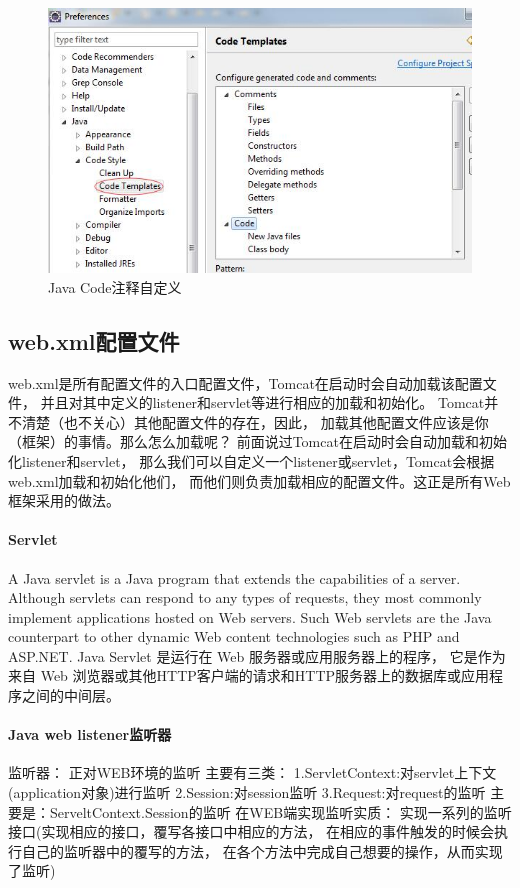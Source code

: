 \documentclass{book}
\begin{document}
\begin{figure}[htbp]
	\centering
	\includegraphics[scale=0.6]{JavaCodeTemplate.jpg}
	\caption{Java Code注释自定义}
	\label{code:JavaCodeTemplate}
\end{figure}

\subsection{web.xml配置文件}

web.xml是所有配置文件的入口配置文件，Tomcat在启动时会自动加载该配置文件，
并且对其中定义的listener和servlet等进行相应的加载和初始化。
Tomcat并不清楚（也不关心）其他配置文件的存在，因此，
加载其他配置文件应该是你（框架）的事情。那么怎么加载呢？
前面说过Tomcat在启动时会自动加载和初始化listener和servlet，
那么我们可以自定义一个listener或servlet，Tomcat会根据web.xml加载和初始化他们，
而他们则负责加载相应的配置文件。这正是所有Web框架采用的做法。


\paragraph{Servlet}
A Java servlet is a Java program that extends the capabilities of a server. 
Although servlets can respond to any types of requests, 
they most commonly implement applications hosted on Web servers.
Such Web servlets are the Java counterpart to other dynamic 
Web content technologies such as PHP and ASP.NET.
Java Servlet 是运行在 Web 服务器或应用服务器上的程序，
它是作为来自 Web 浏览器或其他HTTP客户端的请求和HTTP服务器上的数据库或应用程序之间的中间层。

\paragraph{Java web listener监听器}
监听器：
    正对WEB环境的监听
    主要有三类：
        1.ServletContext:对servlet上下文(application对象)进行监听
        2.Session:对session监听
        3.Request:对request的监听
主要是：ServeltContext.Session的监听
在WEB端实现监听实质：
实现一系列的监听接口(实现相应的接口，覆写各接口中相应的方法，
在相应的事件触发的时候会执行自己的监听器中的覆写的方法，
在各个方法中完成自己想要的操作，从而实现了监听)
\end{document}
